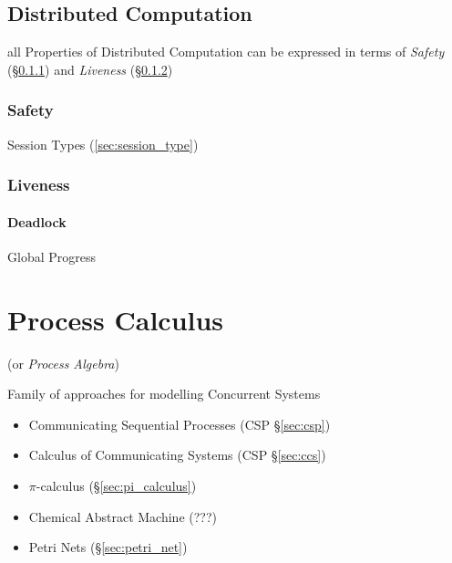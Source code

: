 \subsection{Distributed Computation}\label{sec:distributed_computation}

all Properties of Distributed Computation can be expressed in terms of
\emph{Safety} (\S\ref{sec:safety}) and \emph{Liveness}
(\S\ref{sec:liveness})



\subsubsection{Safety}\label{sec:safety}

\fist Session Types (\ref{sec:session_type})



\subsubsection{Liveness}\label{sec:liveness}

\paragraph{Deadlock}\label{sec:deadlock}\hfill

Global Progress



\section{Process Calculus}\label{sec:process_calculus}

(or \emph{Process Algebra})

Family of approaches for modelling Concurrent Systems

\begin{itemize}
\item Communicating Sequential Processes (CSP \S\ref{sec:csp})
\item Calculus of Communicating Systems (CSP \S\ref{sec:ccs})
\item $\pi$-calculus (\S\ref{sec:pi_calculus})
\item Chemical Abstract Machine (???)
\item Petri Nets (\S\ref{sec:petri_net})
\end{itemize}

